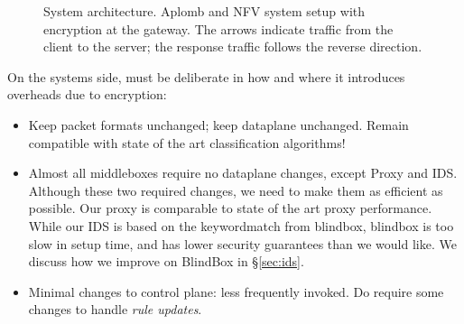  \setcounter{theapp}{0}  
\newcommand{\capp}{\refstepcounter{theapp}\arabic{theapp}}

\begin{figure}[t!]
\centering
{}
%
\hfill  
{}
     
\caption{System architecture. Aplomb and NFV system setup with \sys encryption  at the gateway. The arrows indicate traffic from the client to the server; the response traffic follows the reverse direction. \label{fig:sys-overview}}
\end{figure}


  On the systems side, \sys must be deliberate in how and where it introduces overheads due to encryption:
  
    \begin{itemize}
      \item Keep packet formats unchanged; keep dataplane unchanged. Remain compatible with state of the art classification algorithms!
      \item Almost all middleboxes require no dataplane changes, except Proxy and IDS. Although these two required changes, we need to make them as efficient as possible. Our proxy is comparable to state of the art proxy performance.
      While our IDS is based on the keywordmatch from blindbox, blindbox is too slow in setup time, and has lower security guarantees than we would like. We discuss how we improve on BlindBox in \S\ref{sec:ids}. 
      \item Minimal changes to control plane: less frequently invoked. Do require some changes to handle {\it rule updates}.
    \end{itemize}

